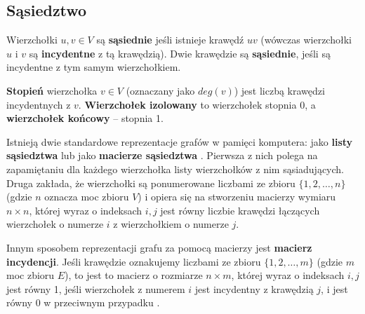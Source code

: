 \subsection*{Sąsiedztwo}

Wierzchołki $u,v \in V$ są \textbf{sąsiednie} jeśli istnieje krawędź $uv$ (wówczas wierzchołki $u$ i $v$ są \textbf{incydentne} z tą krawędzią). Dwie krawędzie są \textbf{sąsiednie}, jeśli są incydentne z tym samym wierzchołkiem. 

\textbf{Stopień} wierzchołka $v \in V$ (oznaczany jako $deg(v)$) jest liczbą krawędzi incydentnych z $v$. \textbf{Wierzchołek izolowany} to wierzchołek stopnia 0, a \textbf{wierzchołek końcowy} -- stopnia 1.

Istnieją dwie standardowe reprezentacje grafów w pamięci komputera: jako \textbf{listy sąsiedztwa} lub jako \textbf{macierze sąsiedztwa} \cites[29]{banachowski}[600]{cormen}. Pierwsza z nich polega na zapamiętaniu dla każdego wierzchołka listy wierzchołków z nim sąsiadujących. Druga zakłada, że wierzchołki są ponumerowane liczbami ze zbioru $\{1, 2,\ldots,n\}$ (gdzie $n$ oznacza moc zbioru $V$) i opiera się na stworzeniu macierzy wymiaru $n \times n$, której wyraz o indeksach $i,j$ jest równy liczbie krawędzi łączących wierzchołek o numerze $i$ z wierzchołkiem o numerze $j$.

Innym sposobem reprezentacji grafu za pomocą macierzy jest \textbf{macierz incydencji}. Jeśli krawędzie oznakujemy liczbami ze zbioru $\{1,2,\ldots,m\}$ (gdzie $m$ moc zbioru $E$), to jest to macierz o rozmiarze $n \times m$, której wyraz o indeksach $i,j$ jest równy 1, jeśli wierzchołek z numerem $i$ jest incydentny z krawędzią $j$, i jest równy 0 w przeciwnym przypadku \cite[27]{ross}.

\begin{figure}[H]
\centering
\caption{}\label{fig:graph-edge-labeled}
\end{figure}

